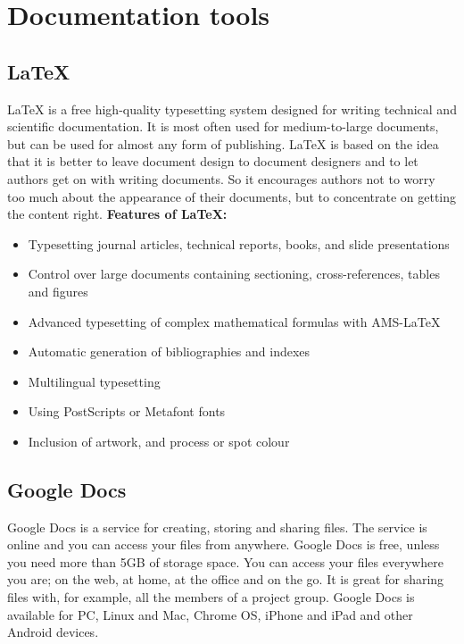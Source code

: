 \section{Documentation tools}

\subsection{LaTeX}
LaTeX is a free high-quality typesetting system designed for writing technical and scientific documentation. It is most often used for medium-to-large documents, but can be used for almost any form of publishing. 
\newline
\newline
LaTeX is based on the idea that it is better to leave document design to document designers and to let authors get on with writing documents. So it encourages authors not to worry too much about the appearance of their documents, but to concentrate on getting the content right.
\newline
\newline
\textbf{Features of LaTeX:}
\begin{itemize}
\item{}Typesetting journal articles, technical reports, books, and slide presentations
\item{}Control over large documents containing sectioning, cross-references, tables and figures
\item{}Advanced typesetting of complex mathematical formulas with AMS-LaTeX
\item{}Automatic generation of bibliographies and indexes
\item{}Multilingual typesetting
\item{}Using PostScripts or Metafont fonts
\item{}Inclusion of artwork, and process or spot colour
\end{itemize}

\subsection{Google Docs}
Google Docs is a service for creating, storing and sharing files. The service is online and you can access your files from anywhere. Google Docs is free, unless you need more than 5GB of storage space. You can access your files everywhere you are; on the web, at home, at the office and on the go. It is great for sharing files with, for example, all the members of a project group. Google Docs is available for PC, Linux and Mac, Chrome OS, iPhone and iPad and other Android devices.


